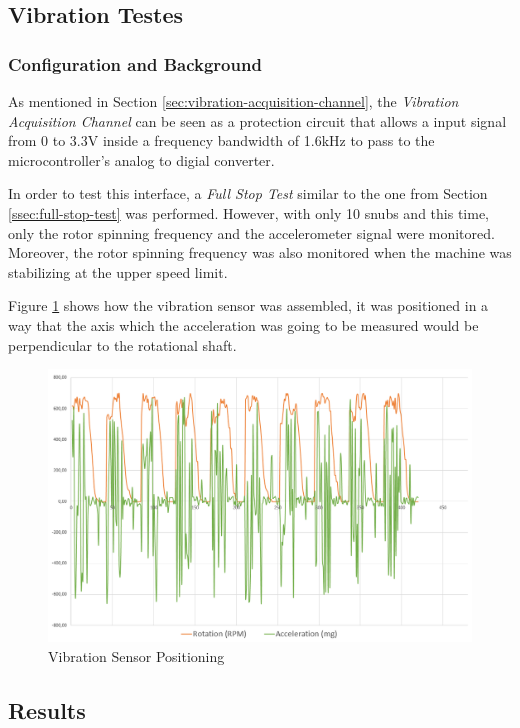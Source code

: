 \subsection{Vibration Testes}\label{ssec:vibrationTests}

	\subsubsection{Configuration and Background}

		As mentioned in Section \ref{sec:vibration-acquisition-channel}, the \textit{Vibration Acquisition Channel} can be seen as a protection circuit that allows a input signal from 0 to 3.3V inside a frequency bandwidth of 1.6kHz to pass to the microcontroller's analog to digial converter.
		\par
		In order to test this interface, a \textit{Full Stop Test} similar to the one from Section \ref{ssec:full-stop-test} was performed. However, with only 10 snubs and this time, only the rotor spinning frequency and the accelerometer signal were monitored. Moreover, the rotor spinning frequency was also monitored when the machine was stabilizing at the upper speed limit.

		Figure \ref{fig:test-vibration-assembly} shows how the vibration sensor was assembled, it was positioned in a way that the axis which the acceleration was going to be measured would be perpendicular to the rotational shaft.

		\begin{figure}[htbp]
			\centering
			\includegraphics[width=.8\textwidth]{figuras/fig-test-vibration-assembly}
			\caption{Vibration Sensor Positioning}
			\label{fig:test-vibration-assembly}
		\end{figure}

	\subsection{Results}	

